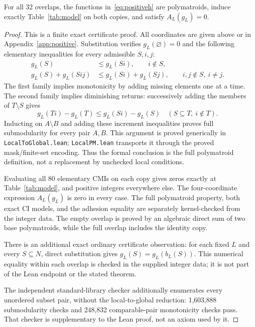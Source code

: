 \documentclass[11pt]{article}
\begin{document}
\begin{lemma}\label{lem:positive}
For all 32 overlaps, the functions in~\eqref{eq:positiveh} are polymatroids,
induce exactly Table~\ref{tab:model} on both copies, and satisfy
$A_L(g_L)=0$.
\end{lemma}
\begin{proof}
This is a finite exact certificate proof. All coordinates are given above or in
Appendix~\ref{app:positive}. Substitution verifies $g_L(\varnothing)=0$ and the
following elementary inequalities for every admissible $S,i,j$:
\begin{align*}
 g_L(S)&\le g_L(Si),\qquad i\notin S,\\
 g_L(S)+g_L(Sij)&\le g_L(Si)+g_L(Sj),
       \qquad i,j\notin S,\ i\ne j.
\end{align*}
The first family implies monotonicity by adding missing elements one at a time.
The second family implies diminishing returns: successively adding the
members of $T\setminus S$ gives
\[
 g_L(Ti)-g_L(T)\le g_L(Si)-g_L(S)
 \quad(S\subseteq T,\ i\notin T).
\]
Inducting on $A\setminus B$ and adding these increment inequalities proves
full submodularity for every pair $A,B$. This argument is proved generically
in \texttt{LocalToGlobal.lean}; \texttt{LocalPM.lean} transports it through the
proved mask/finite-set encoding. Thus the formal conclusion is the full
polymatroid definition, not a replacement by unchecked local conditions.

Evaluating all 80 elementary CMIs on each copy gives zeros exactly at
Table~\ref{tab:model}, and positive integers everywhere else. The
four-coordinate expression $A_L(g_L)$ is zero in every case. The full
polymatroid property, both exact CI models, and the adhesion equality are
separately kernel-checked from the integer data. The empty
overlap is proved by an algebraic direct sum of two base polymatroids, while
the full overlap includes the identity copy.

There is an additional exact ordinary certificate observation: for each fixed
$L$ and every $S\subseteq N$, direct substitution gives
$g_L(S)=g_L(b_L(S))$. This numerical equality within each overlap is checked
in the supplied integer data; it is not part of the Lean endpoint or the
stated theorem.

The independent standard-library checker additionally enumerates every
unordered subset pair, without the local-to-global reduction: 1,603,888
submodularity checks and 248,832 comparable-pair monotonicity checks pass.
That checker is supplementary to the Lean proof, not an axiom used by it.
\end{proof}
\end{document}
